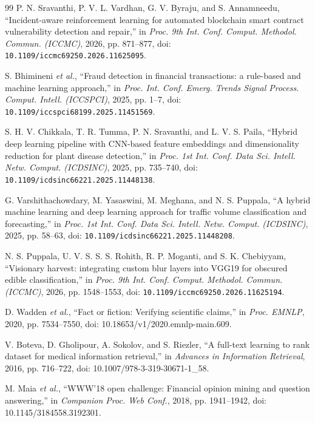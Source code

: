 \documentclass[conference]{IEEEtran}
\begin{document}
\begin{thebibliography}{99}
P. N. Sravanthi, P. V. L. Vardhan, G. V. Byraju, and S. Annamneedu, ``Incident-aware reinforcement learning for automated blockchain smart contract vulnerability detection and repair,'' in \textit{Proc. 9th Int. Conf. Comput. Methodol. Commun. (ICCMC)}, 2026, pp. 871--877, doi: \nolinkurl{10.1109/iccmc69250.2026.11625095}.

S. Bhimineni \textit{et al.}, ``Fraud detection in financial transactions: a rule-based and machine learning approach,'' in \textit{Proc. Int. Conf. Emerg. Trends Signal Process. Comput. Intell. (ICCSPCI)}, 2025, pp. 1--7, doi: \nolinkurl{10.1109/iccspci68199.2025.11451569}.

S. H. V. Chikkala, T. R. Tumma, P. N. Sravanthi, and L. V. S. Paila, ``Hybrid deep learning pipeline with CNN-based feature embeddings and dimensionality reduction for plant disease detection,'' in \textit{Proc. 1st Int. Conf. Data Sci. Intell. Netw. Comput. (ICDSINC)}, 2025, pp. 735--740, doi: \nolinkurl{10.1109/icdsinc66221.2025.11448138}.

G. Varshithachowdary, M. Yasaswini, M. Meghana, and N. S. Puppala, ``A hybrid machine learning and deep learning approach for traffic volume classification and forecasting,'' in \textit{Proc. 1st Int. Conf. Data Sci. Intell. Netw. Comput. (ICDSINC)}, 2025, pp. 58--63, doi: \nolinkurl{10.1109/icdsinc66221.2025.11448208}.

N. S. Puppala, U. V. S. S. S. Rohith, R. P. Moganti, and S. K. Chebiyyam, ``Visionary harvest: integrating custom blur layers into VGG19 for obscured edible classification,'' in \textit{Proc. 9th Int. Conf. Comput. Methodol. Commun. (ICCMC)}, 2026, pp. 1548--1553, doi: \nolinkurl{10.1109/iccmc69250.2026.11625194}.

D. Wadden \textit{et al.}, ``Fact or fiction: Verifying scientific claims,'' in \textit{Proc. EMNLP}, 2020, pp. 7534--7550, doi: 10.18653/v1/2020.emnlp-main.609.

V. Boteva, D. Gholipour, A. Sokolov, and S. Riezler, ``A full-text learning to rank dataset for medical information retrieval,'' in \textit{Advances in Information Retrieval}, 2016, pp. 716--722, doi: 10.1007/978-3-319-30671-1\_58.

M. Maia \textit{et al.}, ``WWW'18 open challenge: Financial opinion mining and question answering,'' in \textit{Companion Proc. Web Conf.}, 2018, pp. 1941--1942, doi: 10.1145/3184558.3192301.


\end{thebibliography}
\end{document}
